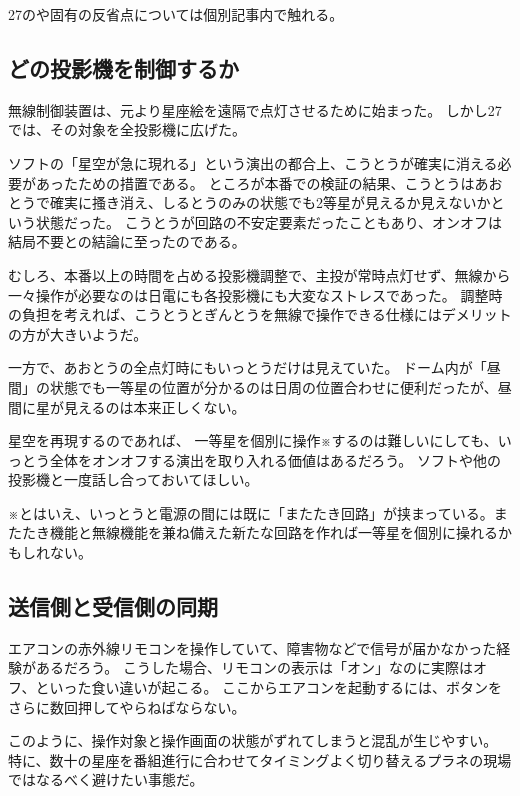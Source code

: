 \documentclass[letterpaper,10pt,dvipdfmx]{sphinxmanual}
\begin{document}
27のや固有の反省点については個別記事内で触れる。


\subsection{どの投影機を制御するか}
\label{\detokenize{wireless/wireless:id12}}
無線制御装置は、元より星座絵を遠隔で点灯させるために始まった。
しかし27では、その対象を全投影機に広げた。

ソフトの「星空が急に現れる」という演出の都合上、こうとうが確実に消える必要があったための措置である。
ところが本番での検証の結果、こうとうはあおとうで確実に搔き消え、しるとうのみの状態でも2等星が見えるか見えないかという状態だった。
こうとうが回路の不安定要素だったこともあり、オンオフは結局不要との結論に至ったのである。

むしろ、本番以上の時間を占める投影機調整で、主投が常時点灯せず、無線から一々操作が必要なのは日電にも各投影機にも大変なストレスであった。
調整時の負担を考えれば、こうとうとぎんとうを無線で操作できる仕様にはデメリットの方が大きいようだ。

一方で、あおとうの全点灯時にもいっとうだけは見えていた。
ドーム内が「昼間」の状態でも一等星の位置が分かるのは日周の位置合わせに便利だったが、昼間に星が見えるのは本来正しくない。

星空を再現するのであれば、
一等星を個別に操作※するのは難しいにしても、いっとう全体をオンオフする演出を取り入れる価値はあるだろう。
ソフトや他の投影機と一度話し合っておいてほしい。

※とはいえ、いっとうと電源の間には既に「またたき回路」が挟まっている。またたき機能と無線機能を兼ね備えた新たな回路を作れば一等星を個別に操れるかもしれない。


\subsection{送信側と受信側の同期}
\label{\detokenize{wireless/wireless:id13}}
エアコンの赤外線リモコンを操作していて、障害物などで信号が届かなかった経験があるだろう。
こうした場合、リモコンの表示は「オン」なのに実際はオフ、といった食い違いが起こる。
ここからエアコンを起動するには、ボタンをさらに数回押してやらねばならない。

このように、操作対象と操作画面の状態がずれてしまうと混乱が生じやすい。
特に、数十の星座を番組進行に合わせてタイミングよく切り替えるプラネの現場ではなるべく避けたい事態だ。
\end{document}
